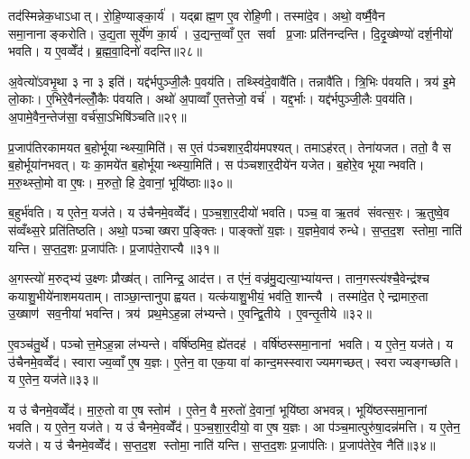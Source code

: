 तद॑स्मिन्नेक॒धाऽधात्। रो॒हि॒ण्याङ्का॒र्य॑। यद्ब्राह्म॒ण ए॒व रो॑हि॒णी। तस्मा॑दे॒व। अथो॒ वर्ष्मै॒वैन समा॒नानाङ्करोति। उ॒द्य॒ता सूर्ये॑ण का॒र्य॑। उ॒द्यन्त॒व्वाँ ए॒त सर्वा प्र॒जाः प्रति॑नन्दन्ति। दि॒दृ॒ख्षेण्यो॑ दर्\mbox{}श॒नीयो॑ भवति। य ए॒वव्वेँद॑। ब्र॒ह्म॒वा॒दिनो॑ वदन्ति॥२८॥

अ॒वेत्यो॑ऽवभृ॒था ३ ना ३ इति॑। यद्द॑र्भपुञ्जी॒लैः प॒वय॑ति। तथ्स्वि॑दे॒वावै॑ति। तन्नावै॑ति। त्रि॒भिः प॑वयति। त्रय॑ इ॒मे लो॒काः। ए॒भिरे॒वैन॑ल्लोँ॒कैः प॑वयति। अथो॑ अ॒पाव्वाँ ए॒तत्तेजो॒ वर्च॑। यद्द॒र्भाः। यद्द॑र्भपुञ्जी॒लैः प॒वय॑ति। अ॒पामे॒वैन॒न्तेज॑सा॒ वर्च॑सा॒ऽभिषि॑ञ्चति॥२९॥\anuvakamend[भ॒व॒न्त्यष्ट्रा॑मव॒रुध्य॑ वदन्ति द॒र्भा यद्द॑र्भपुञ्जी॒लैः प॒वय॒त्येक॑ञ्च]

प्र॒जाप॑तिरकामयत ब॒होर्भूयान्थ्स्या॒मिति॑। स ए॒तं प॑ञ्चशार॒दीय॑मपश्यत्। तमाऽह॑रत्। तेना॑यजत। ततो॒ वै स ब॒होर्भूया॑नभवत्। यः का॒मये॑त ब॒होर्भूयान्थ्स्या॒मिति॑। स प॑ञ्चशार॒दीये॑न यजेत। ब॒होरे॒व भूयान्भवति। म॒रु॒थ्स्तो॒मो वा ए॒षः। म॒रुतो॒ हि दे॒वानां॒ भूयि॑ष्ठाः॥३०॥

ब॒हुर्भ॑वति। य ए॒तेन॒ यज॑ते। य उ॑चैनमे॒वव्वेँद॑। प॒ञ्च॒शा॒र॒दीयो॑ भवति। पञ्च॒ वा ऋ॒तव॑ संवत्स॒रः। ऋ॒तुष्वे॒व स॑व्वँथ्स॒रे प्रति॑तिष्ठति। अथो॒ पञ्चाख्षरा प॒ङ्क्तिः। पाङ्क्तो॑ य॒ज्ञः। य॒ज्ञमे॒वाव॑ रुन्धे। स॒प्त॒द॒श स्तोमा॒ नाति॑ यन्ति। स॒प्त॒द॒शः प्र॒जाप॑तिः। प्र॒जाप॑ते॒राप्त्यै॥३१॥\anuvakamend[भूयि॑ष्ठा यन्ति॒ द्वे च॑]

अ॒गस्त्यो॑ म॒रुद्भ्य॑ उ॒क्ष्णः प्रौख्ष॑त्। तानिन्द्र॒ आद॑त्त। त ए॑नं॒ वज्र॑मु॒द्यत्या॒भ्या॑यन्त। तान॒गस्त्य॑श्चै॒वेन्द्र॑श्च कयाशु॒भीये॑नाशमयताम्। ताञ्छा॒न्तानुपाह्वयत। यत्क॑याशु॒भीयं॒ भव॑ति॒ शान्त्यै। तस्मा॑दे॒त ऐन्द्रामारु॒ता उ॒ख्षाण॑ सव॒नीया॑ भवन्ति। त्रय॑ प्रथ॒मेऽह॒न्ना ल॑भ्यन्ते। ए॒वन्द्वि॒तीये। ए॒वन्तृ॒तीये॥३२॥

ए॒वञ्च॑तु॒र्थे। पञ्चोत्त॒मेऽह॒न्ना ल॑भ्यन्ते। वर्\mbox{}षि॑ष्ठमिव॒ ह्ये॑तदह॑। वर्\mbox{}षि॑ष्ठस्समा॒नानां भवति। य ए॒तेन॒ यज॑ते। य उ॑चैनमे॒वव्वेँद॑। स्वाराज्य॒व्वाँ ए॒ष य॒ज्ञः। ए॒तेन॒ वा एक॒या वा॑ कान्द॒मस्स्वाराज्यमगच्छत्। स्वराज्यङ्गच्छति। य ए॒तेन॒ यज॑ते॥३३॥

य उ॑ चैनमे॒वव्वेँद॑। मा॒रु॒तो वा ए॒ष स्तोम॑। ए॒तेन॒ वै म॒रुतो॑ दे॒वानां॒ भूयि॑ष्ठा अभवन्न्। भूयि॑ष्ठस्समा॒नानां भवति। य ए॒तेन॒ यज॑ते। य उ॑ चैनमे॒वव्वेँद॑। प॒ञ्च॒शा॒र॒दीयो॒ वा ए॒ष य॒ज्ञः। आ प॑ञ्च॒मात्पुरु॑षा॒दन्न॑मत्ति। य ए॒तेन॒ यज॑ते। य उ॑ चैनमे॒वव्वेँद॑। स॒प्त॒द॒श स्तोमा॒ नाति॑ यन्ति। स॒प्त॒द॒शः प्र॒जाप॑तिः। प्र॒जाप॑तेरे॒व नैति॑॥३४॥\anuvakamend[तृ॒तीये॑ गच्छति॒ य ए॒तेन॒ यज॑तेऽत्ति॒ य ए॒तेन॒ यज॑ते॒ य उ॑ चैनमे॒वव्वेँद॒ त्रीणि॑ च (अ॒गस्त्य॒ स्वाराज्यं मारु॒तः प॑ञ्चशार॒दीयो॒ वा ए॒ष य॒ज्ञस्स॑प्तद॒शं प्र॒जाप॑तेरे॒व नैति॑ ॥ )]

